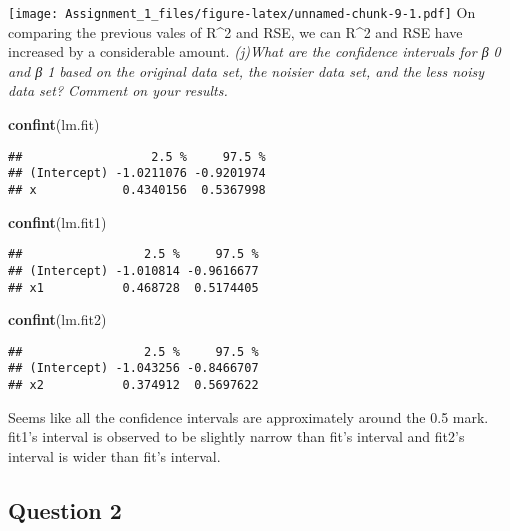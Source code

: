 \documentclass[]{article}
\newenvironment{Shaded}{\begin{snugshade}}{\end{snugshade}}
\newcommand{\KeywordTok}[1]{\textcolor[rgb]{0.13,0.29,0.53}{\textbf{#1}}}
\newcommand{\NormalTok}[1]{#1}
\begin{document}
\texttt{[image: Assignment\_1\_files/figure-latex/unnamed-chunk-9-1.pdf]}
On comparing the previous vales of R\^{}2 and RSE, we can R\^{}2 and RSE
have increased by a considerable amount. \emph{(j)What are the
confidence intervals for β 0 and β 1 based on the original data set, the
noisier data set, and the less noisy data set? Comment on your results.}

\begin{Shaded}
\begin{Highlighting}[]
\KeywordTok{confint}\NormalTok{(lm.fit)}
\end{Highlighting}
\end{Shaded}

\begin{verbatim}
##                  2.5 %     97.5 %
## (Intercept) -1.0211076 -0.9201974
## x            0.4340156  0.5367998
\end{verbatim}

\begin{Shaded}
\begin{Highlighting}[]
\KeywordTok{confint}\NormalTok{(lm.fit1)}
\end{Highlighting}
\end{Shaded}

\begin{verbatim}
##                 2.5 %     97.5 %
## (Intercept) -1.010814 -0.9616677
## x1           0.468728  0.5174405
\end{verbatim}

\begin{Shaded}
\begin{Highlighting}[]
\KeywordTok{confint}\NormalTok{(lm.fit2)}
\end{Highlighting}
\end{Shaded}

\begin{verbatim}
##                 2.5 %     97.5 %
## (Intercept) -1.043256 -0.8466707
## x2           0.374912  0.5697622
\end{verbatim}

Seems like all the confidence intervals are approximately around the 0.5
mark. fit1's interval is observed to be slightly narrow than fit's
interval and fit2's interval is wider than fit's interval.

\subsection{Question 2}\label{question-2}
\end{document}
